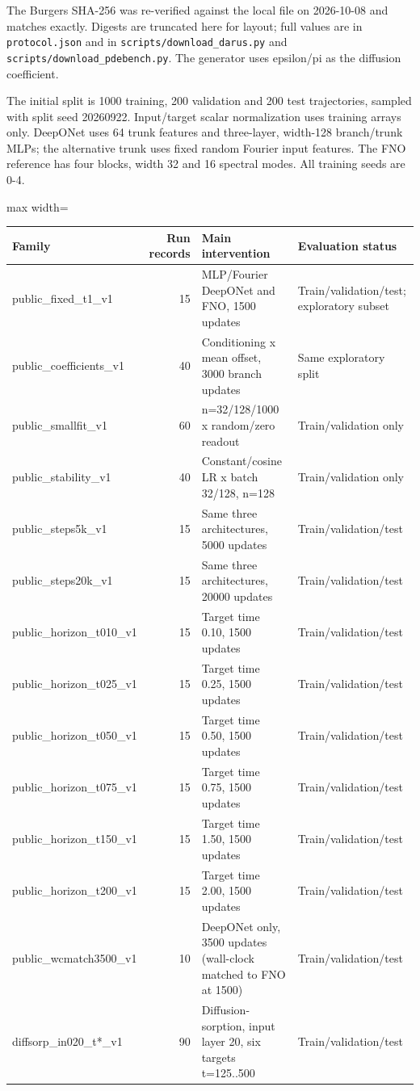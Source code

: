 \documentclass[preprint,12pt]{elsarticle}
\begin{document}
The Burgers SHA-256 was re-verified against the local file on 2026-10-08 and matches exactly. Digests are truncated here for layout; full values are in \texttt{protocol.json} and in \texttt{scripts/download\_darus.py} and \texttt{scripts/download\_pdebench.py}. The generator uses epsilon/pi as the diffusion coefficient.

The initial split is 1000 training, 200 validation and 200 test trajectories, sampled with split seed 20260922. Input/target scalar normalization uses training arrays only. DeepONet uses 64 trunk features and three-layer, width-128 branch/trunk MLPs; the alternative trunk uses fixed random Fourier input features. The FNO reference has four blocks, width 32 and 16 spectral modes. All training seeds are 0-4.

\begin{center}
\begin{adjustbox}{max width=\linewidth}
\small
\begin{tabular}{lrll}
\toprule
Family & Run records & Main intervention & Evaluation status \\
\midrule
public\_fixed\_t1\_v1 & 15 & MLP/Fourier DeepONet and FNO, 1500 updates & Train/validation/test; exploratory subset \\
public\_coefficients\_v1 & 40 & Conditioning x mean offset, 3000 branch updates & Same exploratory split \\
public\_smallfit\_v1 & 60 & n=32/128/1000 x random/zero readout & Train/validation only \\
public\_stability\_v1 & 40 & Constant/cosine LR x batch 32/128, n=128 & Train/validation only \\
public\_steps5k\_v1 & 15 & Same three architectures, 5000 updates & Train/validation/test \\
public\_steps20k\_v1 & 15 & Same three architectures, 20000 updates & Train/validation/test \\
public\_horizon\_t010\_v1 & 15 & Target time 0.10, 1500 updates & Train/validation/test \\
public\_horizon\_t025\_v1 & 15 & Target time 0.25, 1500 updates & Train/validation/test \\
public\_horizon\_t050\_v1 & 15 & Target time 0.50, 1500 updates & Train/validation/test \\
public\_horizon\_t075\_v1 & 15 & Target time 0.75, 1500 updates & Train/validation/test \\
public\_horizon\_t150\_v1 & 15 & Target time 1.50, 1500 updates & Train/validation/test \\
public\_horizon\_t200\_v1 & 15 & Target time 2.00, 1500 updates & Train/validation/test \\
public\_wcmatch3500\_v1 & 10 & DeepONet only, 3500 updates (wall-clock matched to FNO at 1500) & Train/validation/test \\
diffsorp\_in020\_t*\_v1 & 90 & Diffusion-sorption, input layer 20, six targets t=125..500 & Train/validation/test \\
\bottomrule
\end{tabular}
\end{adjustbox}
\end{center}
\end{document}

